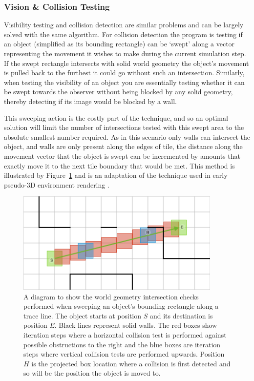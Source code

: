 \documentclass[a4paper,12pt]{article}
\begin{document}
\subsubsection{Vision \& Collision Testing}\noindent
Visibility testing and collision detection are similar problems and can be largely solved with the same algorithm. For collision detection the program is testing if an object (simplified as its bounding rectangle)
can be `swept' along a vector representing the movement it wishes to make during the current simulation step. If the swept rectangle intersects with solid world geometry the object's movement is pulled back to the furthest it could go without such an intersection. Similarly, when testing the visibility of an object you are essentially testing whether it can be swept towards the observer without being blocked by any solid geometry, thereby detecting if its image would be blocked by a wall.

This sweeping action is the costly part of the technique, and so an optimal solution will limit the number of intersections tested with this swept area to the absolute smallest number required. As in this scenario only walls can intersect the object, and walls are only present along the edges of tile, the distance along the movement vector that the object is swept can be incremented by amounts that exactly move it to the next tile boundary that would be met. This method is illustrated by Figure~\ref{fig:trace} and is an adaptation of the technique used in early pseudo-3D environment rendering \cite{raycast}.

\begin{figure}[h]
\centering
\includegraphics[width=0.9\textwidth]{trace}
\caption{A diagram to show the world geometry intersection checks performed when sweeping an object's bounding rectangle along a trace line. The object starts at position $S$ and its destination is position $E$. Black lines represent solid walls. The red boxes show iteration steps where a horizontal collision test is performed against possible obstructions to the right and the blue boxes are iteration steps where vertical collision tests are performed upwards. Position $H$ is the projected box location where a collision is first detected and so will be the position the object is moved to.}
\label{fig:trace}
\end{figure}
\end{document}

